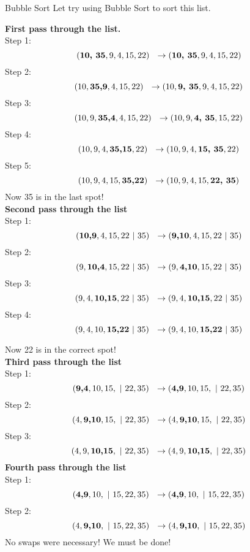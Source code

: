 \begin{examplewithoutcode}{Bubble Sort}{}{}
Let try using Bubble Sort to sort this list.

\textbf{First pass through the list.}\\
Step 1:
$$ 
(\textbf{10, 35}, 9, 4, 15, 22) \ \ \rightarrow \\ 
(\textbf{10, 35}, 9, 4, 15, 22) 
 $$
 Step 2:
$$ 
(10, \textbf{35,9}, 4, 15, 22) \ \ \rightarrow \\ 
(10, \textbf{9, 35}, 9, 4, 15, 22) 
 $$
 Step 3:
$$ 
(10,9,\textbf{35,4}, 4, 15, 22) \ \ \rightarrow \\ 
(10,9,\textbf{4, 35},15, 22) 
 $$
  Step 4:
$$ 
(10,9,4, \textbf{35,15}, 22) \ \ \rightarrow \\ 
(10,9,4,\textbf{15, 35}, 22) 
 $$
 Step 5:
 $$ 
(10,9,4,15, \textbf{35,22}) \ \ \rightarrow \\ 
(10,9,4,15, \textbf{22, 35}) 
 $$
 Now 35 is in the last spot!\\
 
 \textbf{Second pass through the list}\\
  Step 1:
 $$ 
(\textbf{10,9},4,15,22 \  | \  35) \ \ \rightarrow \\ 
(\textbf{9,10},4,15,22 \  | \  35) 
 $$
   Step 2:
 $$ 
(9,\textbf{10,4},15,22\  | \ 35) \ \ \rightarrow \\ 
(9,\textbf{4,10},15,22\  | \ 35) 
 $$
    Step 3:
 $$ 
(9,4,\textbf{10,15},22\  | \ 35) \ \ \rightarrow \\ 
(9,4,\textbf{10,15},22\  | \ 35) 
 $$
     Step 4:
 $$ 
(9,4,10,\textbf{15,22}\  | \ 35) \ \ \rightarrow \\ 
(9,4,10,\textbf{15,22}\  | \ 35) 
 $$
 
 Now 22 is in the correct spot!\\
 
 \textbf{Third pass through the list}\\
 Step 1:
 $$ 
(\textbf{9,4},10,15, \  | \ 22,35) \ \ \rightarrow \\ 
(\textbf{4,9},10,15, \  | \ 22,35)
 $$
  Step 2:
 $$ 
(4,\textbf{9,10},15, \  | \ 22,35) \ \ \rightarrow \\ 
(4,\textbf{9,10},15, \  | \ 22,35)
 $$
  Step 3:
 $$ 
(4,9,\textbf{10,15}, \  | \ 22,35) \ \ \rightarrow \\ 
(4,9,\textbf{10,15}, \  | \ 22,35)
 $$
  \textbf{Fourth pass through the list}\\
 Step 1:
  $$ 
(\textbf{4,9},10, \  | \ 15, 22,35) \ \ \rightarrow \\ 
(\textbf{4,9},10, \  | \ 15, 22,35)
 $$
  Step 2:
  $$ 
(4,\textbf{9,10}, \  | \ 15, 22,35) \ \ \rightarrow \\ 
(4,\textbf{9,10}, \  | \ 15, 22,35)
 $$
 No swaps were necessary!  We must be done!
 

\end{examplewithoutcode}
